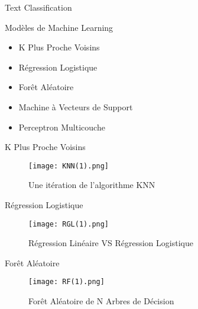 \documentclass[10pt,sans,usenames,dvipsnames,english,compress]{beamer}
\begin{document}
\begin{frame}{Text Classification}
	\begin{exampleblock}{Modèles de Machine Learning}
            \begin{itemize}
            \item K Plus Proche Voisins
            \item Régression Logistique
            \item Forêt Aléatoire
            \item Machine à Vecteurs de Support
            \item Perceptron Multicouche
            \end{itemize}
	\end{exampleblock}

\end{frame}

\begin{frame}{K Plus Proche Voisins}
\begin{figure}[!h]
    \centering
    \texttt{[image: KNN(1).png]}
    \caption{Une itération de l'algorithme KNN}
\end{figure}
\end{frame}

\begin{frame}{Régression Logistique}
\begin{figure}[!h]
    \centering
    \texttt{[image: RGL(1).png]}
    \caption{Régression Linéaire VS Régression Logistique}
\end{figure}
\end{frame}

\begin{frame}{Forêt Aléatoire}
\begin{figure}[!h]
    \centering
    \texttt{[image: RF(1).png]}
    \caption{Forêt Aléatoire de N Arbres de Décision}
\end{figure}    
\end{frame}
\end{document}
